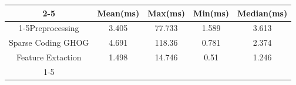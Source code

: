 \documentclass{standalone}
\begin{document}
 
 \begin{tabular}{|c |c |c |c |c |}
\cline{2-5}\cline{2-5} \multicolumn{1}{c |}{ } & Mean(ms) & Max(ms) & Min(ms) & Median(ms)\\ 
\cline{1-5}Preprocessing & 3.405 & 77.733 & 1.589 & 3.613\\ 
 \hhline{|=|=|=|=|=|}Sparse Coding GHOG & 4.691 & 118.36 & 0.781 & 2.374\\ 
 \hhline{|=|=|=|=|=|}Feature Extaction & 1.498 & 14.746 & 0.51 & 1.246\\ 
 \cline{1-5}\hline \end{tabular}
 
\end{document}
